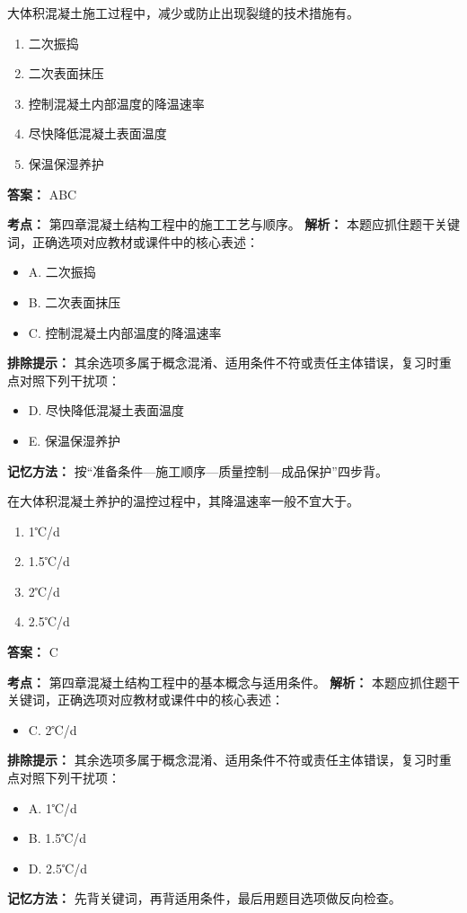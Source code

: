 \documentclass[UTF8,fontset=fandol,11pt]{ctexart}
\begin{document}
\begin{quizbox}[title={第 82 题}]
大体积混凝土施工过程中，减少或防止出现裂缝的技术措施有。\\
\begin{enumerate}[label=\Alph*.]
\item 二次振捣
\item 二次表面抹压
\item 控制混凝土内部温度的降温速率
\item 尽快降低混凝土表面温度
\item 保温保湿养护
\end{enumerate}
\textbf{答案：} ABC
\vspace{0.25em}
\begin{answerbox}[title={考点解析}]
\textbf{考点：} 第四章混凝土结构工程中的施工工艺与顺序。
\textbf{解析：} 本题应抓住题干关键词，正确选项对应教材或课件中的核心表述：
\begin{itemize}
\item A. 二次振捣
\item B. 二次表面抹压
\item C. 控制混凝土内部温度的降温速率
\end{itemize}
\textbf{排除提示：} 其余选项多属于概念混淆、适用条件不符或责任主体错误，复习时重点对照下列干扰项：
\begin{itemize}
\item D. 尽快降低混凝土表面温度
\item E. 保温保湿养护
\end{itemize}
\textbf{记忆方法：} 按“准备条件—施工顺序—质量控制—成品保护”四步背。
\end{answerbox}
\end{quizbox}

\begin{quizbox}[title={第 83 题}]
在大体积混凝土养护的温控过程中，其降温速率一般不宜大于。\\
\begin{enumerate}[label=\Alph*.]
\item 1℃/d
\item 1.5℃/d
\item 2℃/d
\item 2.5℃/d
\end{enumerate}
\textbf{答案：} C
\vspace{0.25em}
\begin{answerbox}[title={考点解析}]
\textbf{考点：} 第四章混凝土结构工程中的基本概念与适用条件。
\textbf{解析：} 本题应抓住题干关键词，正确选项对应教材或课件中的核心表述：
\begin{itemize}
\item C. 2℃/d
\end{itemize}
\textbf{排除提示：} 其余选项多属于概念混淆、适用条件不符或责任主体错误，复习时重点对照下列干扰项：
\begin{itemize}
\item A. 1℃/d
\item B. 1.5℃/d
\item D. 2.5℃/d
\end{itemize}
\textbf{记忆方法：} 先背关键词，再背适用条件，最后用题目选项做反向检查。
\end{answerbox}
\end{quizbox}
\end{document}
